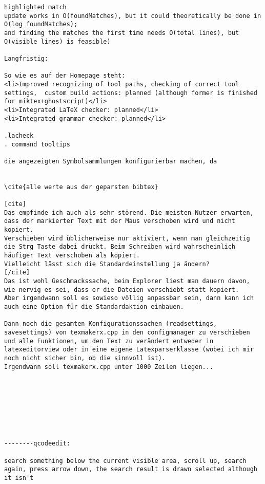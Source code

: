 \documentclass[10pt,a4paper,landscape]{report}
\begin{document}
\begin{verbatim}
highlighted match
update works in O(foundMatches), but it could theoretically be done in O(log foundMatches);
and finding the matches the first time needs O(total lines), but O(visible lines) is feasible)

Langfristig:

So wie es auf der Homepage steht:
<li>Improved recognizing of tool paths, checking of correct tool settings,  custom build actions: planned (although former is finished for miktex+ghostscript)</li>
<li>Integrated LaTeX checker: planned</li>
<li>Integrated grammar checker: planned</li>

.lacheck
. command tooltips

die angezeigten Symbolsammlungen konfigurierbar machen, da


\cite{alle werte aus der geparsten bibtex}

[cite]
Das empfinde ich auch als sehr störend. Die meisten Nutzer erwarten, dass der markierter Text mit der Maus verschoben wird und nicht kopiert.
Verschieben wird üblicherweise nur aktiviert, wenn man gleichzeitig die Strg Taste dabei drückt. Beim Schreiben wird wahrscheinlich häufiger Text verschoben als kopiert.
Vielleicht lässt sich die Standardeinstellung ja ändern? 
[/cite]
Das ist wohl Geschmackssache, beim Explorer liest man dauern davon, wie nervig es sei, dass er die Dateien verschiebt statt kopiert.
Aber irgendwann soll es sowieso völlig anpassbar sein, dann kann ich auch eine Option für die Standardaktion einbauen.

Dann noch die gesamten Konfigurationssachen (readsettings, savesettings) von texmakerx.cpp in den configmanager zu verschieben und alle Funktionen, um den Text zu verändert entweder in latexeditorview oder in eine eigene Latexparserklasse (wobei ich mir noch nicht sicher bin, ob die sinnvoll ist).
Irgendwann soll texmakerx.cpp unter 1000 Zeilen liegen...








--------qcodeedit:

search something below the current visible area, scroll up, search again, press arrow down, the search result is drawn selected although it isn't

\end{verbatim}
\end{document}
